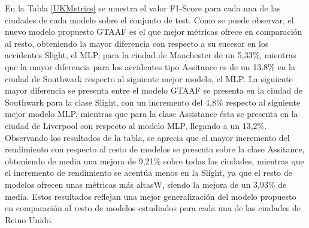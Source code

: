 \documentclass{uathesis-es}
\begin{document}
{	%
	
	
	
	
	
	
	
	En la Tabla \ref{UKMetrics} se muestra el valor F1-Score para cada una de las ciudades de cada modelo sobre el conjunto de test. Como se puede observar, el nuevo modelo propuesto GTAAF es el que mejor métricas ofrece en comparación al resto, obteniendo la mayor diferencia con respecto a su sucesor en los accidentes Slight, el MLP, para la ciudad de Manchester de un 5,33\%, mientras que la mayor diferencia para los accidentes tipo Assitance es de un 13.8\% en la ciudad de Southwark respecto al siguiente mejor modelo, el MLP. La siguiente mayor diferencia se presenta entre el modelo GTAAF se presenta en la ciudad de Southwark para la clase Slight, con un incremento del 4,8\% respecto al siguiente mejor modelo MLP, mientras que para la clase Assistance ésta se presenta en la ciudad de Liverpool con respecto al modelo MLP, llegando a un 13,2\%. Observando los resultados de la tabla, se aprecia que el mayor incremento del rendimiento con respecto al resto de modelos se presenta sobre la clase Assitance, obteniendo de media una mejora de 9,21\% sobre todas las ciudades, mientras que el incremento de rendimiento se acentúa menos en la Slight, ya que el resto de modelos ofrecen unas métricas más altasW, siendo la mejora de un 3,93\% de media. Estos resultados reflejan una mejor generalización del modelo propuesto en comparación al resto de modelos estudiados para cada una de las ciudades de Reino Unido.
	
}
\end{document}
